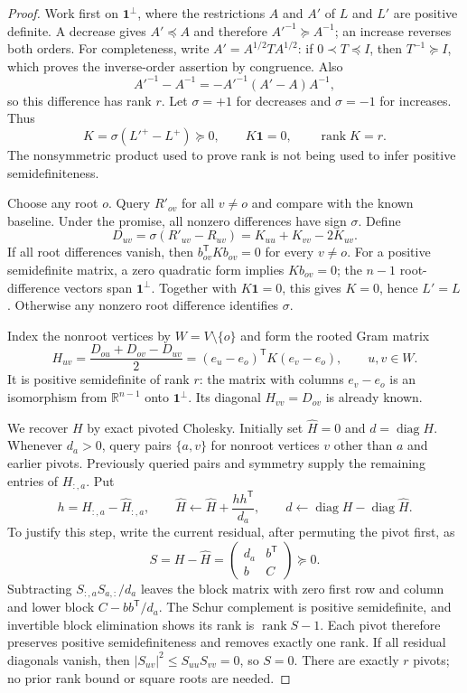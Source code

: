 \documentclass[11pt,letterpaper]{article}
\newcommand{\one}{\mathbf 1}
\newcommand{\rank}{\operatorname{rank}}
\newcommand{\diag}{\operatorname{diag}}
\begin{document}
\begin{proof}
Work first on $\one^\perp$, where the restrictions $A$ and $A'$ of $L$ and $L'$ are positive definite. A decrease gives $A'\preceq A$ and therefore $A'^{-1}\succeq A^{-1}$; an increase reverses both orders. For completeness, write $A'=A^{1/2}TA^{1/2}$: if $0\prec T\preceq I$, then $T^{-1}\succeq I$, which proves the inverse-order assertion by congruence. Also
\[
 A'^{-1}-A^{-1}=-A'^{-1}(A'-A)A^{-1},
\]
so this difference has rank $r$. Let $\sigma=+1$ for decreases and $\sigma=-1$ for increases. Thus
\[
 K=\sigma(L'^+-L^+)\succeq0,\qquad K\one=0,\qquad \rank K=r.
\]
The nonsymmetric product used to prove rank is not being used to infer positive semidefiniteness.

Choose any root $o$. Query $R'_{ov}$ for all $v\ne o$ and compare with the known baseline. Under the promise, all nonzero differences have sign $\sigma$. Define
\[
 D_{uv}=\sigma(R'_{uv}-R_{uv})=K_{uu}+K_{vv}-2K_{uv}.
\]
If all root differences vanish, then $b_{ov}^{\mathsf T}K b_{ov}=0$ for every $v\ne o$. For a positive semidefinite matrix, a zero quadratic form implies $K b_{ov}=0$; the $n-1$ root-difference vectors span $\one^\perp$. Together with $K\one=0$, this gives $K=0$, hence $L'=L$. Otherwise any nonzero root difference identifies $\sigma$.

Index the nonroot vertices by $W=V\setminus\{o\}$ and form the rooted Gram matrix
\[
 H_{uv}=\frac{D_{ou}+D_{ov}-D_{uv}}2
        =(e_u-e_o)^{\mathsf T}K(e_v-e_o),\qquad u,v\in W.
\]
It is positive semidefinite of rank $r$: the matrix with columns $e_v-e_o$ is an isomorphism from $\mathbb R^{n-1}$ onto $\one^\perp$. Its diagonal $H_{vv}=D_{ov}$ is already known.

We recover $H$ by exact pivoted Cholesky. Initially set $\widehat H=0$ and $d=\diag H$. Whenever $d_a>0$, query pairs $\{a,v\}$ for nonroot vertices $v$ other than $a$ and earlier pivots. Previously queried pairs and symmetry supply the remaining entries of $H_{:,a}$. Put
\[
 h=H_{:,a}-\widehat H_{:,a},\qquad
 \widehat H\leftarrow\widehat H+\frac{hh^{\mathsf T}}{d_a},\qquad
 d\leftarrow\diag H-\diag\widehat H.
\]
To justify this step, write the current residual, after permuting the pivot first, as
\[
 S=H-\widehat H=
 \begin{pmatrix}d_a&b^{\mathsf T}\\ b&C\end{pmatrix}\succeq0.
\]
Subtracting $S_{:,a}S_{a,:}/d_a$ leaves the block matrix with zero first row and column and lower block $C-bb^{\mathsf T}/d_a$. The Schur complement is positive semidefinite, and invertible block elimination shows its rank is $\rank S-1$. Each pivot therefore preserves positive semidefiniteness and removes exactly one rank. If all residual diagonals vanish, then $|S_{uv}|^2\le S_{uu}S_{vv}=0$, so $S=0$. There are exactly $r$ pivots; no prior rank bound or square roots are needed.


\end{proof}
\end{document}

